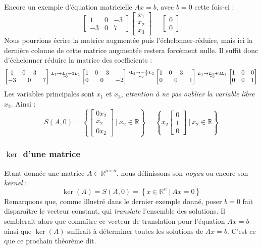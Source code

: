 \documentclass{article}
\newcommand{\R}{\mathbb{R}}
\newcommand{\cross}{\times}
\begin{document}
Encore un exemple d'équation matricielle $Ax = b$, avec $b = 0$ cette fois-ci :
$$
\begin{bmatrix}
1 & 0  & -3\\
-3 & 0 & 7
\end{bmatrix}
\begin{bmatrix}
x_1 \\ x_2 \\x_3
\end{bmatrix}
=
\begin{bmatrix}
0 \\ 0
\end{bmatrix}
$$
Nous pourrions écrire la matrice augmentée puis l'échelonner-réduire, mais ici la dernière colonne de cette matrice augmentée restera forcément nulle. Il suffit donc d'échelonner réduire la matrice des coefficients :
$$
\begin{bmatrix}
1 & 0 - 3\\
-3 & 0 & 7
\end{bmatrix}
\overset{L_2 \to L_2 + 3L_1}{\sim}
\begin{bmatrix}
1 & 0 - 3\\
0 & 0 & -2
\end{bmatrix}
\overset{\L_2 \to -\frac{1}{2}L_2}{\sim}
\begin{bmatrix}
1 & 0 -3\\
0 & 0 & 1
\end{bmatrix}
\overset{L_1 \to L_1 + 3L_2}{\sim}
\begin{bmatrix}
1 & 0 & 0\\
0 & 0 & 1
\end{bmatrix}
$$
Les variables principales sont $x_1$ et $x_3$, \textit{attention à ne pas oublier la variable libre $x_2$}. Ainsi :
$$
S(A,0) = \left\{
\begin{bmatrix}
0x_2 \\ x_2 \\ 0x_2
\end{bmatrix} \ | \ x_2 \in \R
\right\} =  \left\{
x_2\begin{bmatrix}
0 \\ 1 \\ 0
\end{bmatrix} \ | \ x_2 \in \R
\right\}
$$

\subsubsection*{$\ker$ d'une matrice}
Etant donnée une matrice $A \in \R^{p \cross n}$, nous définissons son \textit{noyau} ou encore son \textit{kernel} :
$$
\ker(A) = S(A,0) = \left\{x \in \R^n \ | \ Ax = 0\right\}
$$
Remarquons que, comme illustré dans le dernier exemple donné, poser $b = 0$ fait disparaître le vecteur constant, qui \textit{translate} l'ensemble des solutions. Il semblerait alors que connaître ce vecteur de translation pour l'équation $Ax=b$ ainsi que $\ker(A)$ suffirait à déterminer toutes les solutions de $Ax=b$. C'est ce que ce prochain théorème dit.\\
\end{document}

